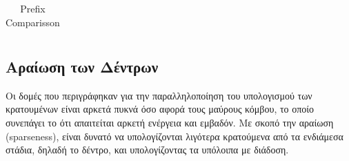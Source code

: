 \begin{table}[H]
\begin{tabular}{  c c c c  }
    \end{tabular}
    
    
    
    
\caption{Prefix Comparisson}
\end{table}

















\subsection{Αραίωση των Δέντρων}
\label{subsection:prefix_sparseness}
Οι δομές που περιγράφηκαν για την παραλληλοποίηση του υπολογισμού των κρατουμένων 
είναι αρκετά πυκνά όσο αφορά τους μαύρους κόμβου, το οποίο συνεπάγει το ότι 
απαιτείται αρκετή ενέργεια και εμβαδόν. Με σκοπό την αραίωση (sparseness), 
είναι δυνατό να υπολογίζονται λιγότερα κρατούμενα από τα ενδιάμεσα στάδια,
δηλαδή το δέντρο, και υπολογίζοντας τα υπόλοιπα με διάδοση.

